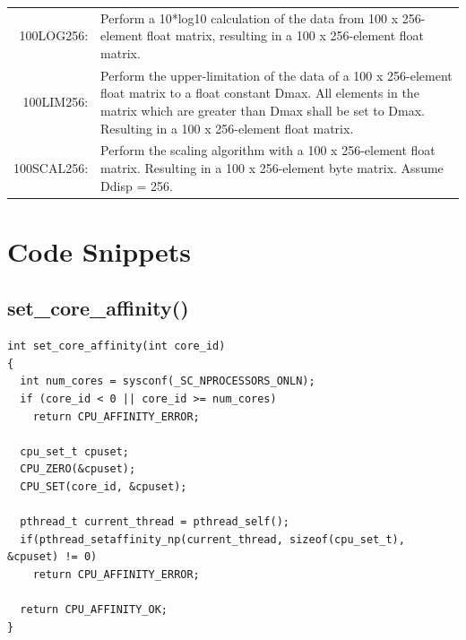 \begin{longtable}{rp{120mm}}
	100LOG256: & Perform a 10*log10 calculation of the data from 100 x 256-element float matrix, resulting in a 100 x 256-element float matrix. \\[0.2cm]	
	100LIM256: & Perform the upper-limitation of the data of a 100 x 256-element float matrix to a float constant Dmax. All elements in the matrix which are greater than Dmax shall be set to Dmax. Resulting in a 100 x 256-element float matrix. \\[0.2cm]
	100SCAL256: & Perform the scaling algorithm with a 100 x 256-element float matrix. Resulting in a 100 x 256-element byte matrix. Assume Ddisp = 256.\\[0.2cm]
\end{longtable}

\cleardoublepage
\chapter{Code Snippets}
\label{app:code}

\section{set\_core\_affinity()}
\label{app:code:core_affinity}


\begin{lstlisting}[caption=Set core affinity of calling thread]
int set_core_affinity(int core_id)
{
  int num_cores = sysconf(_SC_NPROCESSORS_ONLN);
  if (core_id < 0 || core_id >= num_cores)
    return CPU_AFFINITY_ERROR;

  cpu_set_t cpuset;
  CPU_ZERO(&cpuset);
  CPU_SET(core_id, &cpuset);

  pthread_t current_thread = pthread_self();
  if(pthread_setaffinity_np(current_thread, sizeof(cpu_set_t), &cpuset) != 0) 
    return CPU_AFFINITY_ERROR;

  return CPU_AFFINITY_OK;
}
\end{lstlisting}


